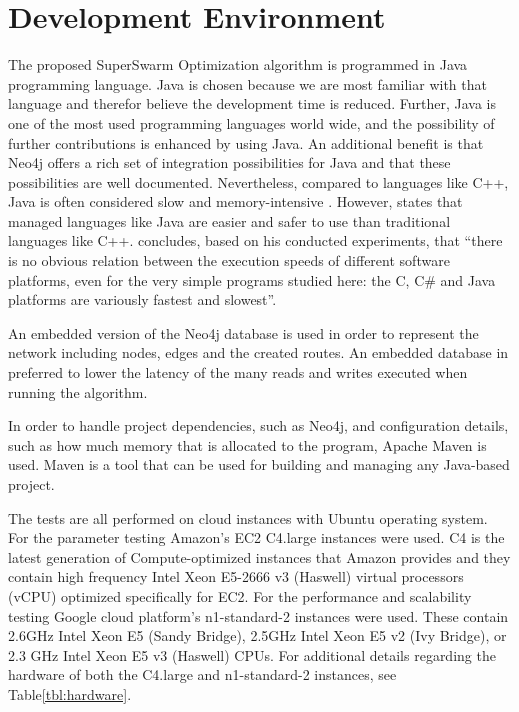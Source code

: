 \section{Development Environment}

The proposed SuperSwarm Optimization algorithm is programmed in Java programming language. Java is chosen because we are most familiar with that language and therefor believe the development time is reduced. Further, Java is one of the most used programming languages world wide, and the possibility of further contributions is enhanced by using Java. An additional benefit is that Neo4j offers a rich set of integration possibilities for Java and that these possibilities are well documented. Nevertheless, compared to languages like C++, Java is often considered slow and memory-intensive \citep{alnaser12}. However, \citet{sestoft10} states that managed languages like Java are easier and safer to use than traditional languages like C++. \citet{sestoft10} concludes, based on his conducted experiments, that ``there is no obvious relation between the execution speeds of different software platforms, even for the very simple programs studied here: the C, C\# and Java platforms are variously fastest and slowest''.

An embedded version of the Neo4j database is used in order to represent the network including nodes, edges and the created routes. An embedded database in preferred to lower the latency of the many reads and writes executed when running the algorithm.

In order to handle project dependencies, such as Neo4j, and configuration details, such as how much memory that is allocated to the program, Apache Maven\citep{website:maven} is used. Maven is a tool that can be used for building and managing any Java-based project. 

The tests are all performed on cloud instances with Ubuntu operating system. For the parameter testing Amazon's EC2 C4.large instances were used. C4 is the latest generation of Compute-optimized instances that Amazon provides and they contain high frequency Intel Xeon E5-2666 v3 (Haswell) virtual processors (vCPU) optimized specifically for EC2\citep{website:amazon}. For the performance and scalability testing Google cloud platform's n1-standard-2 instances were used. These contain 2.6GHz Intel Xeon E5 (Sandy Bridge), 2.5GHz Intel Xeon E5 v2 (Ivy Bridge), or 2.3 GHz Intel Xeon E5 v3 (Haswell) CPUs\citep{website:google}. For additional details regarding the hardware of both the C4.large and n1-standard-2 instances, see Table\vref{tbl:hardware}. 

